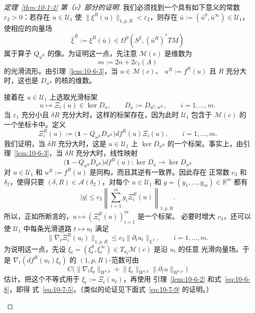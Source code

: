 \begin{proof}[定理~\ref{thm:10-1-2} 第（v）部分的证明]
我们必须找到一个具有如下意义的常数 $\varepsilon_2>0$：若存在
$u\in\mathcal U_1$ 使 $\lVert\xi^R(u)\rVert_{1,p,R}<\varepsilon_2$，则存在
$\bar u:=(\bar u^0,\bar u^\infty)\in\mathcal U_1$，使相应的向量场
\[
  \bar\xi^R:=\xi^R(\bar u)
  \in\Omega^0(S^2,(\bar u^R)^*TM)
\]
属于算子 $Q_{\bar u^R}$ 的像。为证明这一点，先注意
$\mathcal M(c)$ 是维数为
\[
  m:=2n+2c_1(A)
\]
的光滑流形。由引理~\ref{lem:10-6-3}，当 $u\in\mathcal M(c)$、
$u^R:=f^R(u)$ 且 $R$ 充分大时，这也是 $D_{u^R}$ 的核的维数。

接着在 $u\in\mathcal U_1$ 上选取光滑标架
\[
  u\longmapsto\Xi_i(u)\in\ker D_u,
  \qquad D_u:=D_{u^0,u^\infty},
  \qquad i=1,\ldots,m.
\]
当 $\varepsilon_1$ 充分小且 $\delta R$ 充分大时，这样的标架存在，因为此时
$\mathcal U_1$ 包含于 $\mathcal M(c)$ 的一个坐标卡中。定义
\[
  \Xi_i^R(u):=
  \bigl(\mathbf 1-Q_{u^R}D_{u^R}\bigr)df^R(u)\Xi_i(u),
  \qquad i=1,\ldots,m.
\]
我们证明，当 $\delta R$ 充分大时，这是 $u\in\mathcal U_1$ 上
$\ker D_{u^R}$ 的一个标架。事实上，由引理~\ref{lem:10-6-3}，当 $\delta R$
充分大时，线性映射
\[
  \bigl(\mathbf 1-Q_{u^R}D_{u^R}\bigr)df^R(u):
  \ker D_u\longrightarrow\ker D_{u^R}
\]
对 $u\in\mathcal U_1$ 和 $u^R:=f^R(u)$ 是同构，而且其逆有一致界。因此存在
正常数 $c_3$ 和 $\delta_2$，使得只要
$(\delta,R)\in\mathcal A(\delta_2)$，对每个 $u\in\mathcal U_1$ 和
$y=(y_1,\ldots,y_m)\in\mathbb R^m$ 都有
\begin{equation}\label{eq:10-7-4}
  |y|\leq c_3
  \left\lVert\sum_{i=1}^m y_i\Xi_i^R(u)\right\rVert_{1,p,R}.
\end{equation}
所以，正如所断言的，$u\mapsto(\Xi_i^R(u))_{i=1}^m$ 是一个标架。
必要时增大 $c_3$，还可以使 $\mathcal U_1$ 中每条光滑道路
$t\mapsto u_t$ 满足
\begin{equation}\label{eq:10-7-5}
  \bigl\lVert\nabla_t\Xi_i^R(u_t)\bigr\rVert_{1,p,R}
  \leq c_3\lVert\partial_tu_t\rVert_{L^2},
  \qquad i=1,\ldots,m.
\end{equation}
为说明这一点，先设
$\xi_t=(\xi_t^0,\xi_t^\infty)\in T_{u_t}\mathcal M(c)$ 是沿 $u_t$ 的任意
光滑向量场。于是 $\nabla_t(df^R(u_t)\xi_t)$ 的 $(1,p,R)$-范数可由
\[
  C\bigl(\lVert\nabla_t\xi_t\rVert_{W^{1,p}}
  +\lVert\xi_t\rVert_{W^{1,p}}
   \lVert\partial_tu\rVert_{W^{1,p}}\bigr)
\]
估计。把这个不等式用于 $\xi_t:=\Xi_i(u_t)$，再使用
引理~\ref{lem:10-6-2} 和式~\eqref{eq:10-6-8}，即得
式~\eqref{eq:10-7-5}。（类似的论证见下面式~\eqref{eq:10-7-9} 的证明。）

\begin{figure}[tbp]
\centering
{}
\end{figure}
\end{proof}
